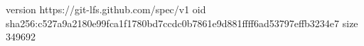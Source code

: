 version https://git-lfs.github.com/spec/v1
oid sha256:c527a9a2180e99fca1f1780bd7ccdc0b7861e9d881ffff6ad53797effb3234e7
size 349692
